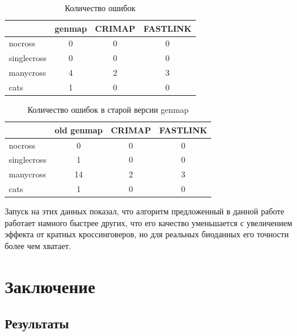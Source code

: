 \documentclass{matmex-diploma-custom}
\begin{document}
\begin{table}[h]
  \centering
  \begin{tabular}{lccc}
    \hline
    & genmap & CRIMAP & FASTLINK \\
    \hline
    nocross & 0 & 0 & 0 \\
    singlecross & 0 & 0 & 0 \\
    manycross & 4 & 2 & 3 \\
    cats & 1 & 0 & 0 \\
    \hline
  \end{tabular}
  \caption{Количество ошибок}
  \label{tab:qual}
\end{table}

\begin{table}[h]
  \centering
  \begin{tabular}{lccc}
    \hline
    & old genmap & CRIMAP & FASTLINK \\
    \hline
    nocross & 0 & 0 & 0 \\
    singlecross & 1 & 0 & 0 \\
    manycross & 14 & 2 & 3 \\
    cats & 1 & 0 & 0 \\
    \hline
  \end{tabular}
  \caption{Количество ошибок в старой версии genmap}
  \label{tab:old}
\end{table}

Запуск на этих данных показал, что алгоритм предложенный в данной
работе работает намного быстрее других, что его качество уменьшается с
увеличением эффекта от кратных кроссинговеров, но для реальных
биоданных его точности более чем хватает.

\section*{Заключение}

\subsection*{Результаты}
\end{document}
